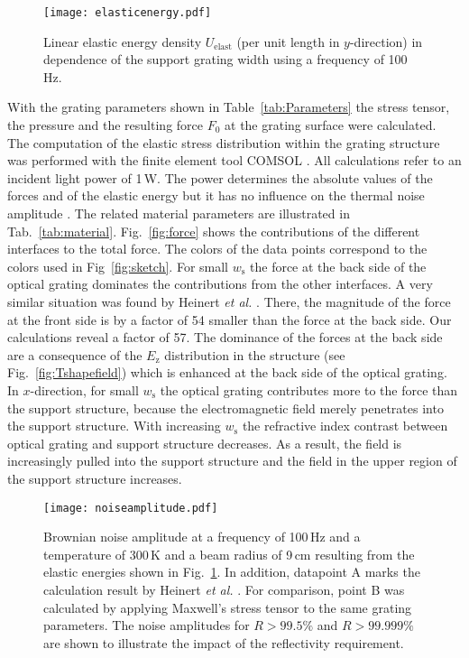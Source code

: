 \documentclass[twocolumn,secnumarabic,amssymb, nobibnotes, aps, prd, showpacs]{revtex4-1}
\begin{document}
\begin{figure}[tb]
	\centering
		\texttt{[image: elasticenergy.pdf]}
	\caption{Linear elastic energy density $U_\mathrm{elast}$ (per unit length in $y$-direction) in dependence of the support grating width using a frequency of 100\,Hz.}
	\label{fig:energy}
\end{figure}
\noindent With the grating parameters shown in Table~\ref{tab:Parameters} the stress tensor, the pressure and the resulting force $F_0$ at the grating surface were calculated. The computation of the elastic stress distribution within the grating structure was performed with the finite element tool COMSOL \cite{comsol}. All calculations refer to an incident light power of 1\,W. The power determines the absolute values of the forces and of the elastic energy but it has no influence on the thermal noise amplitude \cite{Dem2015, Tug2017}. The related material parameters are illustrated in Tab.~\ref{tab:material}. Fig.~\ref{fig:force} shows the contributions of the different interfaces to the total force. The colors of the data points correspond to the colors used in Fig~\ref{fig:sketch}. For small $w_\mathrm{s}$ the force at the back side of the optical grating dominates the contributions from the other interfaces. A very similar situation was found by Heinert \textit{et al.} \cite{Hei2013}. There, the magnitude of the force at the front side is by a factor of 54 smaller than the force at the back side. Our calculations reveal a factor of 57. The dominance of the forces at the back side are a consequence of the $E_\mathrm{z}$ distribution in the structure (see Fig.~\ref{fig:Tshapefield}) which is enhanced at the back side of the optical grating.\newline 
In $x$-direction, for small $w_\mathrm{s}$ the optical grating contributes more to the force than the support structure, because the electromagnetic field merely penetrates into the support structure. With increasing $w_\mathrm{s}$ the refractive index contrast between optical grating and support structure decreases. As a result, the field is increasingly pulled into the support structure and the field in the upper region of the support structure increases.
\begin{figure}[b]
	\centering
		\texttt{[image: noiseamplitude.pdf]}
	\caption{Brownian noise amplitude at a frequency of 100\,Hz and a temperature of 300\,K and a beam radius of 9\,cm resulting from the elastic energies shown in Fig.~\ref{fig:energy}. In addition, datapoint A marks the calculation result by Heinert \textit{et al.} \cite{Hei2013}. For comparison, point B was calculated by applying Maxwell's stress tensor to the same grating parameters. The noise amplitudes for $R>99.5\%$ and $R>99.999\%$ are shown to illustrate the impact of the reflectivity requirement.} 
	\label{fig:noiseamplitude}
\end{figure}
\end{document}
